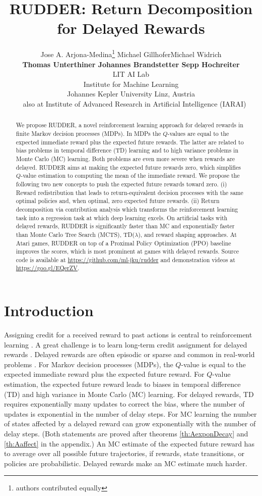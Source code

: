 \documentclass{article}
\title{RUDDER: Return Decomposition for Delayed Rewards}
\author{\vspace{0.1cm} Jose A. Arjona-Medina\thanks{authors contributed equally} \quad Michael Gillhofer\footnotemark[1] \quad Michael Widrich\footnotemark[1] \\ {\vspace{0.1cm}\bf Thomas Unterthiner \quad Johannes Brandstetter \quad Sepp Hochreiter\footnotemark[2]} \\
  LIT AI Lab \\ Institute for Machine Learning\\
  Johannes Kepler University Linz, Austria \\
  \footnotemark[2]~~also at Institute of Advanced Research in Artificial Intelligence (IARAI)
}
\begin{document}
\maketitle


\begin{abstract}
We propose RUDDER,
a novel reinforcement learning approach
for delayed rewards in finite Markov decision processes (MDPs).
In MDPs the $Q$-values are equal to the
expected immediate reward plus the expected future rewards.
The latter are related to bias problems 
in temporal difference (TD) learning and to
high variance problems in Monte Carlo (MC) learning.
Both problems are even more severe when rewards are delayed.
RUDDER aims at making the expected future rewards
zero, which simplifies $Q$-value estimation to
computing the mean of the immediate reward.
We propose the following two new concepts to push the
expected future rewards toward zero.
(i) Reward redistribution that leads to return-equivalent
decision processes with the same optimal policies and, when optimal,
zero expected future rewards.
(ii) Return decomposition via contribution analysis which
transforms the reinforcement learning task 
into a regression task at which deep learning excels. 
On artificial tasks with delayed rewards,
RUDDER is significantly faster than 
MC and exponentially faster than Monte Carlo Tree Search (MCTS), TD($\lambda$),
and reward shaping approaches.
At Atari games, 
RUDDER on top of a Proximal Policy Optimization (PPO) baseline improves the scores, 
which is most prominent at games with delayed rewards.
Source code is available at \url{https://github.com/ml-jku/rudder} and demonstration videos at \url{https://goo.gl/EQerZV}.
\end{abstract}

\section{Introduction}

Assigning credit for a received reward to past actions
is central to reinforcement learning \cite{Sutton:18book}.
A great challenge is to learn long-term credit assignment for delayed 
rewards \cite{Ke:18,Hung:18,Hernandez-Leal:18,Sahni:18}.
Delayed rewards are often episodic or sparse
and common in real-world problems \cite{Rahmandad:09,Luoma:17}.
For Markov decision processes (MDPs), 
the $Q$-value is equal to the expected immediate reward plus 
the expected future reward.
For $Q$-value estimation,
the expected future reward leads to biases in temporal difference (TD) and
high variance in Monte Carlo (MC) learning.
For delayed rewards, 
TD requires exponentially many updates to correct the bias, 
where the number of updates is exponential in the number of delay steps.
For MC learning the number of states affected by a delayed reward can 
grow exponentially with the number of delay steps. 
(Both statements are proved after 
theorems \ref{th:AexponDecay} and \ref{th:Aaffect} in the appendix.)
An MC estimate of the expected future reward 
has to average over all possible future trajectories,
if rewards, state transitions, or policies are probabilistic.
Delayed rewards make an MC estimate much harder.
    
\end{document}
